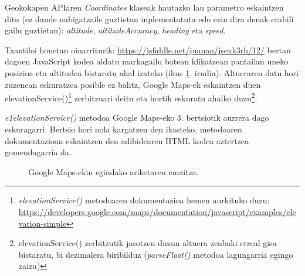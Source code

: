 Geokokapen APIaren \textit{Coordinates} klaseak hautazko lau parametro eskaintzen ditu (ez daude nabigatzaile guztietan inplementatuta edo ezin dira denak erabili gailu guztietan):
\textit{altitude}, \textit{altitudeAccuracy}, \textit{heading} eta \textit{speed}.

Txantiloi honetan oinarriturik:
\href{https://jsfiddle.net/juanan/jsexk3rh/12/}{https://jsfiddle.net/juanan/jsexk3rh/12/} bertan dagoen JavaScript kodea aldatu markagailu batean klikatzean pantailan uneko posizioa  eta altitudea bistaratu ahal izateko (ikus \ref{fig:maps-ariketa}. irudia). Altueraren datu hori zuzenean eskuratzea posible ez balitz, Google Maps-ek eskaintzen duen elevationService()\footnote{
\textit{elevationService()} metodoaren dokumentazioa hemen aurkituko duzu:\\
\href{https://developers.google.com/maps/documentation/javascript/examples/elevation-simple}{https://developers.google.com/maps/documentation/javascript/examples/elevation-simple}
} zerbitzuari deitu eta hortik eskuratu ahalko duzu\footnote{elevationService() zerbitzutik jasotzen duzun altuera zenbaki erreal gisa bistaratu, bi dezimalera biribilduz (\textit{parseFloat()} metodoa lagungarria egingo zaizu)}.

\textit{e1elevationService()} metodoa Google Maps-eko 3. bertsiotik aurrera dago eskuragarri. Bertsio
hori nola kargatzen den ikasteko, metodoaren dokumentazioan eskaintzen den adibidearen HTML kodea aztertzea gomendagarria da.


\begin{figure}[ht]
	\centering
{}
\caption{Google Maps-ekin egindako ariketaren emaitza.}
\label{fig:maps-ariketa}
\end{figure}


